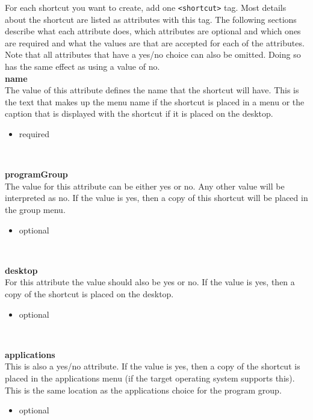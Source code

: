 For each shortcut you want to create, add one \texttt{<shortcut>} tag. Most
details about the shortcut are listed as attributes with this tag. The
following sections describe what each attribute does, which attributes
are optional and which ones are required and what the values are that
are accepted for each of the attributes. Note that all attributes that
have a yes/no choice can also be omitted. Doing so has the same effect
as using a value of no.\\

\textbf{name}\\

The value of this attribute defines the name that the shortcut will
have. This is the text that makes up the menu name if the shortcut is
placed in a menu or the caption that is displayed with the shortcut if
it is placed on the desktop.\\
\begin{itemize}
\item required
\end{itemize}\

\textbf{programGroup}\\

The value for this attribute can be either yes or no. Any other value
will be interpreted as no. If the value is yes, then a copy of this
shortcut will be placed in the group menu.\\
\begin{itemize}
\item optional
\end{itemize}\

\textbf{desktop}\\

For this attribute the value should also be yes or no. If the value is
yes, then a copy of the shortcut is placed on the desktop.\\
\begin{itemize}
\item optional
\end{itemize}\

\textbf{applications}\\

This is also a yes/no attribute. If the value is yes, then a copy of the
shortcut is placed in the applications menu (if the target operating
system supports this). This is the same location as the applications
choice for the program group.\\
\begin{itemize}
\item optional
\end{itemize}\

